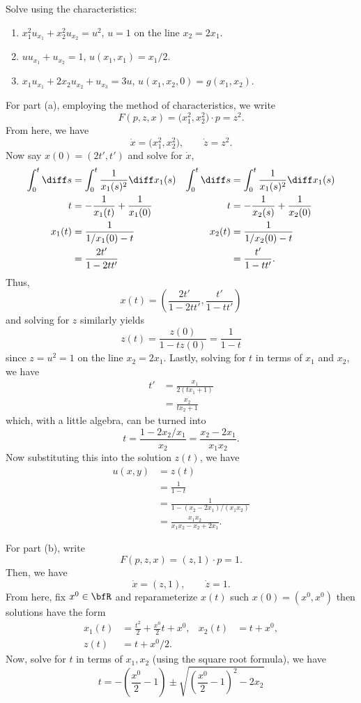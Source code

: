 \begin{problem}
  Solve using the characteristics:
  \begin{enumerate}[label=(\alph*)]
  \item \(x_1^2u_{x_1}+x_2^2u_{x_2}=u^2\), \(u=1\) on the line
    \(x_2=2x_1\).
  \item \(uu_{x_1}+u_{x_2}=1\), \(u(x_1,x_1)=x_1/2\).
  \item \(x_1u_{x_1}+2x_2u_{x_2}+u_{x_3}=3u\),
    \(u(x_1,x_2,0)=g(x_1,x_2)\).
  \end{enumerate}
\end{problem}
\begin{solution}
  For part (a), employing the method of characteristics, we write
  \[
    F(p,z,x)=\bigl(x_1^2,x_2^2\bigr)\cdot p=z^2.
  \]
  From here, we have
  \[
    \dot x=\bigl(x_1^2,x_2^2\bigr),\qquad
    \dot z= z^2.
  \]
  Now say \(x(0)=(2t',t')\) and solve for \(\dot x\),
  \begin{align*}
    \int_0^{t}\diff s&=\int_0^t\frac{1}{x_1(s)^2}\diff x_1(s)
    &\int_0^t\diff s&=\int_0^t\frac{1}{x_1(s)^2}\diff x_1(s)\\
    t&=-\frac{1}{x_1(t)}+\frac{1}{x_1(0)}
    &t&=-\frac{1}{x_2(s)}+\frac{1}{x_2(0)}\\
    x_1(t)&=\frac{1}{1/x_1(0)-t}
    &x_2(t)&=\frac{1}{1/x_2(0)-t}\\
    &=\frac{2t'}{1-2tt'}&
    &=\frac{t'}{1-tt'}.
  \end{align*}
  Thus,
  \[
    x(t)=\left(\frac{2t'}{1-2tt'},\frac{t'}{1-tt'}\right)
  \]
  and solving for \(z\) similarly yields
  \[
    z(t)=\frac{z(0)}{1-tz(0)}=\frac{1}{1-t}
  \]
  since \(z=u^2=1\) on the line \(x_2=2x_1\). Lastly, solving for \(t\) in
  terms of \(x_1\) and \(x_2\), we have
  \begin{align*}
    t'&=\frac{x_1}{2(tx_1+1)}\\
      &=\frac{x_2}{tx_2+1}
  \end{align*}
  which, with a little algebra, can be turned into
  \[
    t=\frac{1-2x_2/x_1}{x_2}=\frac{x_2-2x_1}{x_1x_2}.
  \]
  Now substituting this into the solution \(z(t)\), we have
  \begin{align*}
    u(x,y)&=z(t)\\
          &=\frac{1}{1-t}\\
          &=\frac{1}{1-(x_2-2x_1)/(x_1x_2)}\\
          &=\frac{x_1x_2}{x_1x_2-x_2+2x_1}.
  \end{align*}

  For part (b), write
  \[
    F(p,z,x)=\left(z,1\right)\cdot p=1.
  \]
  Then, we have
  \[
    \dot x=\left(z,1\right),\qquad\dot z=1.
  \]
  From here, fix \(x^0\in\bfR\) and reparameterize \(x(t)\) such
  \(x(0)=(x^0,x^0)\) then solutions have the form
  \begin{align*}
    x_1(t)&=\frac{t^2}{2}+\frac{x^0}{2}t+x^0,
    &x_2(t)&=t+x^0,\\
    z(t)&=t+x^0/2.
  \end{align*}
  Now, solve for \(t\) in terms of \(x_1,x_2\) (using the square root
  formula), we have
  \[
    t=-\left(\frac{x^0}{2}-1\right)\pm\sqrt{\left(\frac{x^0}{2}-1\right)^2-2x_2}
  \]



\end{solution}
